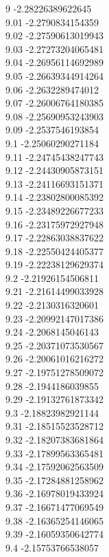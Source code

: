 {9	-2.28226389622645\\
9.01	-2.2790834154359\\
9.02	-2.27590613019943\\
9.03	-2.27273204065481\\
9.04	-2.26956114692989\\
9.05	-2.26639344914264\\
9.06	-2.2632289474012\\
9.07	-2.26006764180385\\
9.08	-2.25690953243903\\
9.09	-2.2537546193854\\
9.1	-2.25060290271184\\
9.11	-2.24745438247743\\
9.12	-2.24430905873151\\
9.13	-2.24116693151371\\
9.14	-2.23802800085392\\
9.15	-2.23489226677233\\
9.16	-2.23175972927948\\
9.17	-2.22863038837622\\
9.18	-2.22550424405377\\
9.19	-2.22238129629374\\
9.2	-2.21926154506811\\
9.21	-2.21614499033928\\
9.22	-2.2130316320601\\
9.23	-2.20992147017386\\
9.24	-2.2068145046143\\
9.25	-2.20371073530567\\
9.26	-2.20061016216272\\
9.27	-2.19751278509072\\
9.28	-2.1944186039855\\
9.29	-2.19132761873342\\
9.3	-2.18823982921144\\
9.31	-2.18515523528712\\
9.32	-2.18207383681864\\
9.33	-2.17899563365481\\
9.34	-2.17592062563509\\
9.35	-2.17284881258962\\
9.36	-2.16978019433924\\
9.37	-2.16671477069549\\
9.38	-2.16365254146065\\
9.39	-2.16059350642774\\
9.4	-2.15753766538057\\
}
